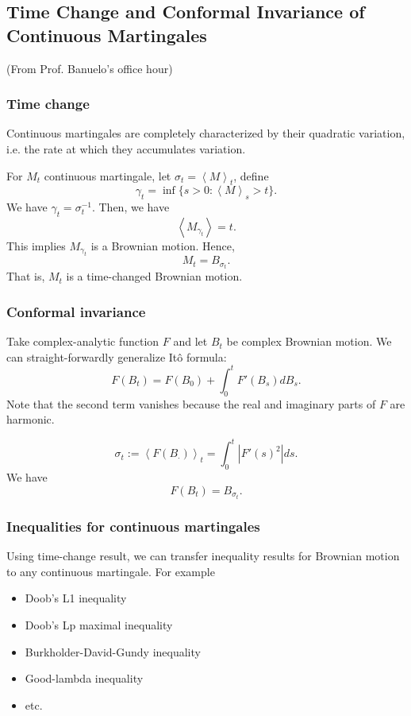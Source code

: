 
\subsection{Time Change and Conformal Invariance of Continuous Martingales}

(From Prof. Banuelo's office hour)

\subsubsection{Time change}


\begin{fact}
	Continuous martingales are completely characterized by their quadratic variation, i.e. the rate at which they accumulates variation.
\end{fact}
For $M_t$ continuous martingale, let $\sigma_t  = \left\langle M \right\rangle _t$, define
\[
	\gamma_t = \inf \{s > 0: \left\langle M \right\rangle _s > t\} 
.\] 
We have $\gamma_t = \sigma_t^{-1}$. Then, we have
\[
	\left\langle M_{\gamma_t} \right\rangle 
	= t
.\] 
This implies $M_{\gamma_t}$ is a Brownian motion. Hence,
\[
	M_t = B_{\sigma_t}
.\] 
That is, $M_t$ is a time-changed Brownian motion.

\subsubsection{Conformal invariance}

Take complex-analytic function $F$ and let $B_t$ be complex Brownian motion. We can straight-forwardly generalize Itô formula:
\[
	F(B_t) = F(B_0) + \int _0^t F'(B_s) d B_s
.\] 
Note that the second term vanishes because the real and imaginary parts of $F$ are harmonic.

\[
	\sigma_t := \left\langle F(B_\cdot ) \right\rangle _t = \int _0^t \left| F'(s)^2 \right| d s
.\] 
We have
\[
	F(B_t) = B_{\sigma_t}
.\] 

\subsubsection{Inequalities for continuous martingales}

Using time-change result, we can transfer inequality results for Brownian motion to any continuous martingale. For example
\begin{itemize}
	\item Doob's L1 inequality
	\item Doob's Lp maximal inequality
	\item Burkholder-David-Gundy inequality
	\item Good-lambda inequality
	\item etc.
\end{itemize}

